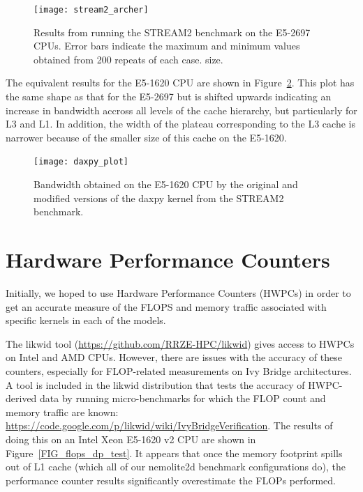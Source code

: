 \documentclass[12pt]{article}
\begin{document}
\begin{figure}
\texttt{[image: stream2\_archer]}
\caption{Results from running the STREAM2 benchmark on the E5-2697
  CPUs. Error bars indicate the maximum and minimum values obtained
  from 200 repeats of each case.  size. }
\label{FIG_stream2}
\end{figure}

 The equivalent results for the E5-1620 CPU are shown in
 Figure~\ref{FIG_daxpy_bw}. This plot has the same shape as that for
 the E5-2697 but is shifted upwards indicating an increase in
 bandwidth accross all levels of the cache hierarchy, but particularly
 for L3 and L1. In addition, the width of the plateau corresponding to
 the L3 cache is narrower because of the smaller size of this cache on
 the E5-1620.

\begin{figure}
\texttt{[image: daxpy\_plot]}
\caption{Bandwidth obtained on the E5-1620 CPU by the original and
  modified versions of the daxpy kernel from the STREAM2 benchmark.}
\label{FIG_daxpy_bw}
\end{figure}

\section{Hardware Performance Counters}

Initially, we hoped to use Hardware Performance Counters (HWPCs) in
order to get an accurate measure of the FLOPS and memory traffic
associated with specific kernels in each of the models.

The likwid tool (\url{https://github.com/RRZE-HPC/likwid}) gives
access to HWPCs on Intel and AMD CPUs.
However, there are issues with the accuracy of these counters,
especially for FLOP-related measurements on Ivy Bridge architectures. A
tool is included in the likwid distribution that tests the accuracy of
HWPC-derived data by running micro-benchmarks for which the FLOP count
and memory traffic are known:
\url{https://code.google.com/p/likwid/wiki/IvyBridgeVerification}.
The results of doing this on an Intel Xeon E5-1620 v2 CPU are shown in
Figure~\ref{FIG_flops_dp_test}. It appears that once the memory
footprint spills out of L1 cache (which all of our nemolite2d
benchmark configurations do), the performance counter results
significantly overestimate the FLOPs performed.
\end{document}
